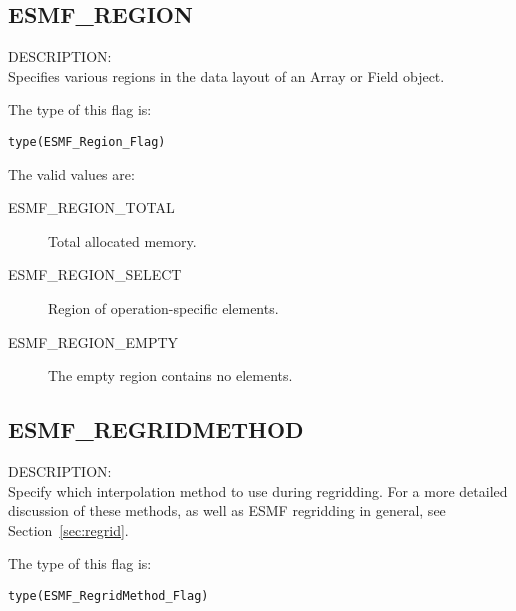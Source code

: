 \subsection{ESMF\_REGION}
\label{const:region}
{\sf DESCRIPTION:\\}
Specifies various regions in the data layout of an Array or Field object.

The type of this flag is:

{\tt type(ESMF\_Region\_Flag)}

The valid values are:
\begin{description}
\item [ESMF\_REGION\_TOTAL]
      Total allocated memory.
\item [ESMF\_REGION\_SELECT]
      Region of operation-specific elements.
\item [ESMF\_REGION\_EMPTY]
      The empty region contains no elements.
\end{description}


\subsection{ESMF\_REGRIDMETHOD}
\label{opt:regridmethod}

{\sf DESCRIPTION:\\}  
Specify which interpolation method to use during regridding. For a more detailed discussion of these methods, as well as ESMF regridding in general, see Section~\ref{sec:regrid}.

The type of this flag is:

{\tt type(ESMF\_RegridMethod\_Flag)}

